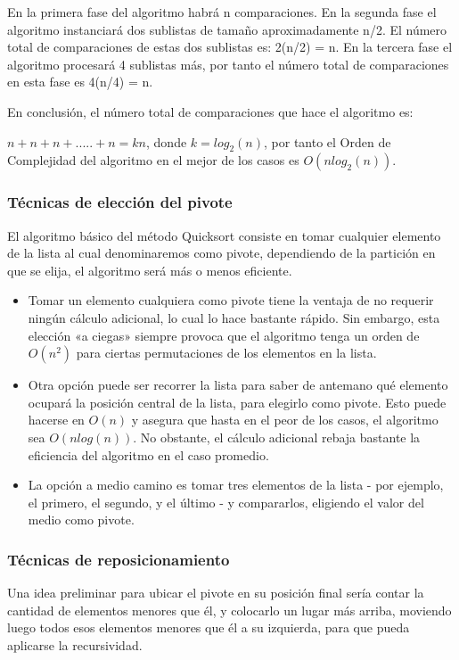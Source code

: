 \documentclass[8pt, A4]{article}    %
\begin{document}
En la primera fase del algoritmo habrá n comparaciones. En la segunda fase el algoritmo instanciará dos sublistas de tamaño aproximadamente n/2. El número total de comparaciones de estas dos sublistas es: 2(n/2) = n. En la tercera fase el algoritmo procesará 4 sublistas más, por tanto el número total de comparaciones en esta fase es 4(n/4) = n.

En conclusión, el número total de comparaciones que hace el algoritmo es:

$ {\displaystyle n+n+n+.....+n=kn}$, donde ${\displaystyle k=log_{2}(n)}$, por tanto el Orden de Complejidad del algoritmo en el mejor de los casos es ${\displaystyle O(nlog_{2}(n))}$.

\bigskip

\subsubsection{Técnicas de elección del pivote}
El algoritmo básico del método Quicksort consiste en tomar cualquier elemento de la lista al cual denominaremos como pivote, dependiendo de la partición en que se elija, el algoritmo será más o menos eficiente.
\begin{itemize}
    \item Tomar un elemento cualquiera como pivote tiene la ventaja de no requerir ningún cálculo adicional, lo cual lo hace bastante rápido. Sin embargo, esta elección «a ciegas» siempre provoca que el algoritmo tenga un orden de $O(n^2)$ para ciertas permutaciones de los elementos en la lista.
    \item Otra opción puede ser recorrer la lista para saber de antemano qué elemento ocupará la posición central de la lista, para elegirlo como pivote. Esto puede hacerse en $O(n)$ y asegura que hasta en el peor de los casos, el algoritmo sea $O(n log(n))$. No obstante, el cálculo adicional rebaja bastante la eficiencia del algoritmo en el caso promedio.
    \item La opción a medio camino es tomar tres elementos de la lista - por ejemplo, el primero, el segundo, y el último - y compararlos, eligiendo el valor del medio como pivote.
\end{itemize}

\bigskip

\subsubsection{Técnicas de reposicionamiento}
Una idea preliminar para ubicar el pivote en su posición final sería contar la cantidad de elementos menores que él, y colocarlo un lugar más arriba, moviendo luego todos esos elementos menores que él a su izquierda, para que pueda aplicarse la recursividad.
\end{document}
